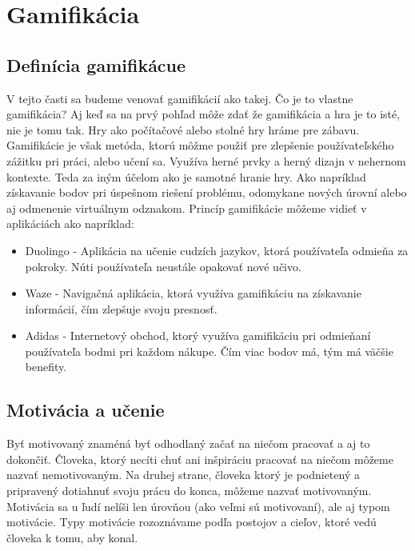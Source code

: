 \documentclass[10pt,oneside,slovak,a4paper]{article}
\begin{document}
\section{Gamifikácia} \label{gamifikacia}
\subsection{Definícia gamifikácue} \label{definicia}
V tejto časti sa budeme venovať gamifikácií ako takej. Čo je to vlastne gamifikácia? Aj keď sa na prvý pohľad môže zdať že gamifikácia a hra je to isté, nie je tomu tak. Hry ako počítačové alebo stolné hry hráme pre zábavu. Gamifikácie je však metóda, ktorú môžme použiť pre zlepšenie používateľského zážitku pri práci, alebo učení sa. Využíva herné prvky a herný dizajn v nehernom kontexte. Teda za iným účelom ako je samotné hranie hry. Ako napríklad získavanie bodov pri úspešnom riešení problému, odomykane nových úrovní alebo aj odmenenie virtuálnym odznakom. Princíp gamifikácie môžeme vidieť v aplikáciách ako napríklad:

\begin{itemize}
    \item Duolingo - Aplikácia na učenie cudzích jazykov, ktorá používateľa odmieňa za pokroky. Núti používateľa neustále opakovať nové učivo.
    \item Waze - Navigačná aplikácia, ktorá využíva gamifikáciu na získavanie informácií, čím zlepšuje svoju presnosť.
    \item Adidas - Internetový obchod, ktorý využíva gamifikáciu pri odmieňaní používateľa bodmi pri každom nákupe. Čím viac bodov má, tým má väčšie benefity.
\end{itemize}

\subsection{Motivácia a učenie} \label{motivacia}
Byť motivovaný znaméná byť odhodlaný začať na niečom pracovať a aj to dokončiť. Človeka, ktorý necíti chuť ani inšpiráciu pracovať na niečom môžeme nazvať nemotivovaným. Na druhej strane, človeka ktorý je podnietený a pripravený dotiahnuť svoju prácu do konca, môžeme nazvať motivovaným. Motivácia sa u ľudí nelíši len úrovňou (ako veľmi sú motivovaní), ale aj typom motivácie. Typy motivácie rozoznávame podľa postojov a cieľov, ktoré vedú človeka k tomu, aby konal. 



\end{document}
